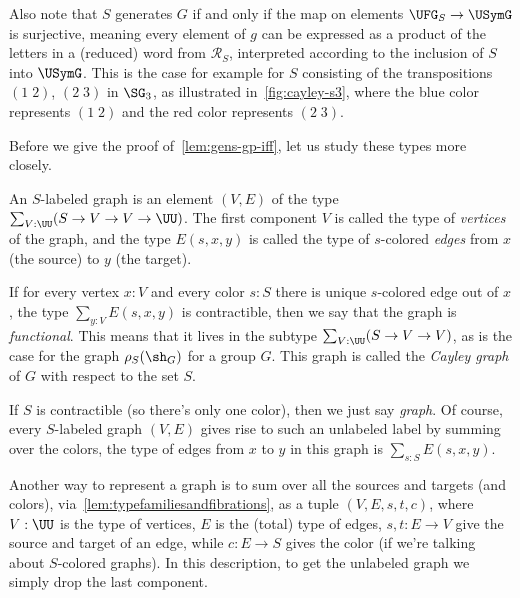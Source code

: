 Also note that $S$ generates $G$ if and only if the map on elements
$\UFG_S \to \USymG$ is surjective, meaning every element of $g$ can be expressed
as a product of the letters in a (reduced) word from $\mathcal R_S$, interpreted
according to the inclusion of $S$ into $\USymG$.
This is the case for example for $S$ consisting of the transpositions
$(1\;2)$, $(2\;3)$ in $\SG_3$, as illustrated in~\cref{fig:cayley-s3},
where the \textcolor{casblue}{blue} color represents $(1\;2)$
and the \textcolor{casred}{red} color represents $(2\;3)$.

Before we give the proof of~\cref{lem:gens-gp-iff}, let us study these types more closely.
\begin{definition}
  An $S$-labeled graph is an element $(V,E)$ of the type
  $\sum_{V:\UU}(S \to V \to V \to \UU)$.%
  The first component $V$ is called the type of \emph{vertices} of the graph,
  and the type $E(s,x,y)$ is called the type of $s$-colored \emph{edges}
  from $x$ (the source) to $y$ (the target).
\end{definition}
If for every vertex $x:V$ and every color $s:S$ there is unique $s$-colored edge out of $x$, \ie the type $\sum_{y:V}E(s,x,y)$ is contractible, then we say that the graph
is \emph{functional}. This means that it lives in the subtype $\sum_{V:\UU}(S \to V \to V)$,
as is the case for the graph $\rho_S(\sh_G)$ for a group $G$.
This graph is called the \emph{Cayley graph} of $G$ with respect to the set $S$.%

If $S$ is contractible (so there's only one color), then we just say \emph{graph}.
Of course, every $S$-labeled graph $(V,E)$ gives rise to such an unlabeled label
by summing over the colors, \ie the type of edges from $x$ to $y$ in this graph
is $\sum_{s:S}E(s,x,y)$.

Another way to represent a graph is to sum over all the sources and targets (and colors),
via~\cref{lem:typefamiliesandfibrations},
\ie as a tuple $(V,E,s,t,c)$, where $V:\UU$ is the type of vertices,
$E$ is the (total) type of edges,
$s,t : E \to V$ give the source and target of an edge,
while $c: E \to S$ gives the color (if we're talking about $S$-colored graphs).
In this description, to get the unlabeled graph we simply drop the last component.

